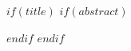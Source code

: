 $if(title)$
\frame{\titlepage}
$if(abstract)$
\begin{abstract}
$abstract$
\end{abstract}
$endif$
$endif$
